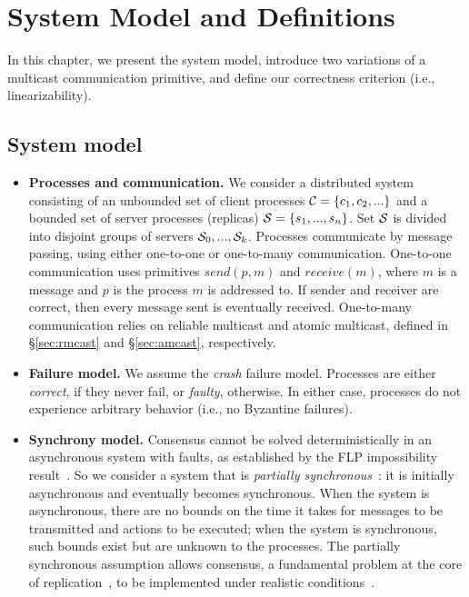 \chapter[System Model and Definitions]{System Model and Definitions}
\label{sec:sysmodel}

In this chapter, we present the system model, introduce two variations of a
multicast communication primitive, and define our correctness criterion (i.e.,
linearizability).

\section{System model}

\begin{itemize}
  \item \textbf{Processes and communication.} We consider a distributed system
  consisting of an unbounded set of client processes $\mathcal{C} = \{c_1, c_2, ...\}$
  and a bounded set of server processes (replicas) $\mathcal{S} = \{s_1, ..., s_n\}$.
  Set $\mathcal{S}$ is divided into disjoint groups of servers $\mathcal{S}_0, ..., \mathcal{S}_k$.
  Processes communicate by message passing, using either one-to-one or
  one-to-many communication. One-to-one communication uses primitives
  $send(p,m)$ and $receive(m)$, where $m$ is a message and $p$ is the process
  $m$ is addressed to. If sender and receiver are correct, then every message
  sent is eventually received. One-to-many communication relies on reliable
  multicast and atomic multicast, defined in \S\ref{sec:rmcast} and
  \S\ref{sec:amcast}, respectively.
  \item \textbf{Failure model.} We assume the \emph{crash} failure model.
  Processes are either \emph{correct}, if they never fail, or \emph{faulty},
  otherwise. In either case, processes do not experience arbitrary behavior
  (i.e., no Byzantine failures).
  \item \textbf{Synchrony model.} Consensus cannot be solved deterministically
  in an asynchronous system with faults, as established by the FLP
  impossibility result~\cite{FLP85}. So we consider a system that is
  \emph{partially synchronous}~\cite{DLS88}: it is initially asynchronous and
  eventually becomes synchronous. When the system is asynchronous, there are no
  bounds on the time it takes for messages to be transmitted and actions to be
  executed; when the system  is synchronous, such bounds exist but are unknown
  to the processes. The partially synchronous assumption allows consensus, a
  fundamental problem at the core of replication~\cite{Lam98,Sch90}, to be
  implemented under realistic conditions~\cite{FLP85,Lam98}.
\end{itemize}


